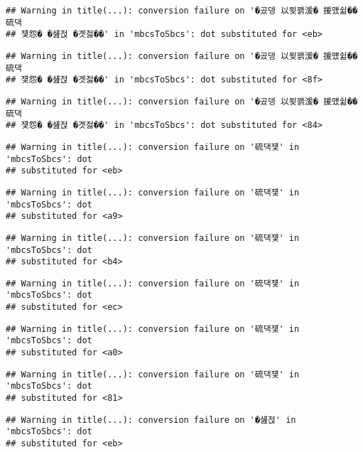 \documentclass[
]{article}
\begin{document}
\begin{verbatim}
## Warning in title(...): conversion failure on '�곴뎅 以묒꽭湲� 援먰쉶�� 硫댁
## 쟻怨� �섎젅 �곗젏��' in 'mbcsToSbcs': dot substituted for <eb>
\end{verbatim}

\begin{verbatim}
## Warning in title(...): conversion failure on '�곴뎅 以묒꽭湲� 援먰쉶�� 硫댁
## 쟻怨� �섎젅 �곗젏��' in 'mbcsToSbcs': dot substituted for <8f>
\end{verbatim}

\begin{verbatim}
## Warning in title(...): conversion failure on '�곴뎅 以묒꽭湲� 援먰쉶�� 硫댁
## 쟻怨� �섎젅 �곗젏��' in 'mbcsToSbcs': dot substituted for <84>
\end{verbatim}

\begin{verbatim}
## Warning in title(...): conversion failure on '硫댁쟻' in 'mbcsToSbcs': dot
## substituted for <eb>
\end{verbatim}

\begin{verbatim}
## Warning in title(...): conversion failure on '硫댁쟻' in 'mbcsToSbcs': dot
## substituted for <a9>
\end{verbatim}

\begin{verbatim}
## Warning in title(...): conversion failure on '硫댁쟻' in 'mbcsToSbcs': dot
## substituted for <b4>
\end{verbatim}

\begin{verbatim}
## Warning in title(...): conversion failure on '硫댁쟻' in 'mbcsToSbcs': dot
## substituted for <ec>
\end{verbatim}

\begin{verbatim}
## Warning in title(...): conversion failure on '硫댁쟻' in 'mbcsToSbcs': dot
## substituted for <a0>
\end{verbatim}

\begin{verbatim}
## Warning in title(...): conversion failure on '硫댁쟻' in 'mbcsToSbcs': dot
## substituted for <81>
\end{verbatim}

\begin{verbatim}
## Warning in title(...): conversion failure on '�섎젅' in 'mbcsToSbcs': dot
## substituted for <eb>
\end{verbatim}
\end{document}
